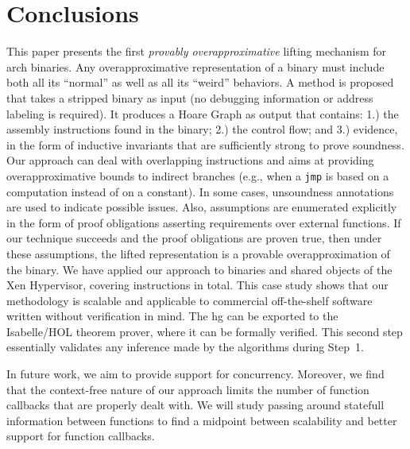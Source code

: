 \section{Conclusions}


This paper presents the first \emph{provably overapproximative} lifting mechanism for \gls{arch} binaries.
Any overapproximative representation of a binary must include both all its ``normal'' as well as all its ``weird'' behaviors.
A method is proposed that takes a stripped binary as input (no debugging information or address labeling is required).
It produces a Hoare Graph as output that contains:
1.) the assembly instructions found in the binary;
2.) the control flow;
and 3.) evidence, in the form of inductive invariants that are sufficiently strong to prove soundness.
Our approach can deal with overlapping instructions and aims at providing overapproximative bounds to indirect branches (e.g., when a \texttt{jmp} is based on a computation instead of on a constant).
In some cases, unsoundness annotations are used to indicate possible issues.
Also, assumptions are enumerated explicitly in the form of proof obligations asserting requirements over external functions.
If our technique succeeds and the proof obligations are proven true, then under these assumptions, the lifted representation is a provable overapproximation of the binary.
We have applied our approach to binaries and shared objects of the Xen Hypervisor, covering \numberinstructions{} instructions in total.
This case study shows that our methodology is scalable and applicable to commercial off-the-shelf software written without verification in mind.
The \ac{hg} can be exported to the Isabelle/HOL theorem prover, where it can be formally verified.
This second step essentially validates any inference made by the algorithms during Step~1.



In future work, we aim to provide support for concurrency.
Moreover, we find that the context-free nature of our approach limits the number of function callbacks that are properly dealt with.
We will study passing around statefull information between functions to find a midpoint between scalability and better support for function callbacks.


